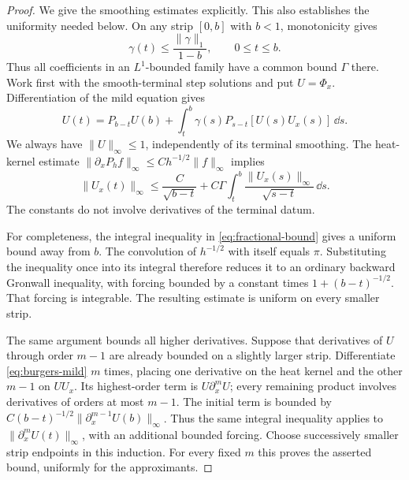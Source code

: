 \begin{proof}
We give the smoothing estimates explicitly.  This also establishes
the uniformity needed below.  On any strip $[0,b]$ with $b<1$,
monotonicity gives
\begin{equation}
 \gamma(t)\leq\frac{\|\gamma\|_1}{1-b},\qquad 0\leq t\leq b.
 \label{eq:local-coefficient-bound}
\end{equation}
Thus all coefficients in an $L^1$-bounded family have a common bound
$\Gamma$ there.  Work first with the smooth-terminal step solutions
and put $U=\Phi_x$.  Differentiation of the mild equation gives
\begin{equation}
 U(t)=P_{b-t}U(b)
       +\int_t^b\gamma(s)P_{s-t}[U(s)U_x(s)]\,\dd s.
 \label{eq:burgers-mild}
\end{equation}
We always have $\|U\|_\infty\leq1$, independently of its terminal
smoothing.  The heat-kernel estimate
$\|\partial_xP_h f\|_\infty\leq C h^{-1/2}\|f\|_\infty$
implies
\begin{equation}
 \|U_x(t)\|_\infty
 \leq \frac{C}{\sqrt{b-t}}
       +C\Gamma\int_t^b
                  \frac{\|U_x(s)\|_\infty}{\sqrt{s-t}}\,\dd s.
 \label{eq:fractional-bound}
\end{equation}
The constants do not involve derivatives of the terminal datum.

For completeness, the integral inequality in
\eqref{eq:fractional-bound} gives a uniform bound away from $b$.
The convolution of $h^{-1/2}$ with itself equals $\pi$.
Substituting the inequality once into its integral therefore reduces
it to an ordinary backward Gronwall inequality, with forcing bounded
by a constant times $1+(b-t)^{-1/2}$.  That forcing is integrable.
The resulting estimate is uniform on every smaller strip.

The same argument bounds all higher derivatives.  Suppose that
derivatives of $U$ through order $m-1$ are already bounded on a
slightly larger strip.  Differentiate \eqref{eq:burgers-mild} $m$
times, placing one derivative on the heat kernel and the other
$m-1$ on $UU_x$.  Its highest-order term is
$U\partial_x^mU$; every remaining product involves derivatives of
orders at most $m-1$.  The initial term is bounded by
$C(b-t)^{-1/2}\|\partial_x^{m-1}U(b)\|_\infty$.
Thus the same integral inequality applies to
$\|\partial_x^mU(t)\|_\infty$, with an additional bounded forcing.
Choose successively smaller strip endpoints in this induction.
For every fixed $m$ this proves the asserted bound, uniformly for
the approximants.


\end{proof}
